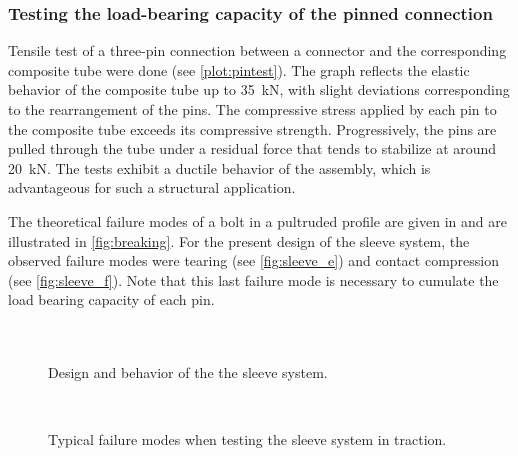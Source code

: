 \subsubsection{Testing the load-bearing capacity of the pinned connection}
Tensile test of a three-pin connection between a connector and the corresponding composite tube were done (see \cref{plot:pintest}). The graph reflects the elastic behavior of the composite tube up to \SI{35}{kN}, with slight deviations corresponding to the rearrangement of the pins. The compressive stress applied by each pin to the composite tube exceeds its compressive strength. Progressively, the pins are pulled through the tube under a residual force that tends to stabilize at around \SI{20}{kN}. The tests exhibit a ductile behavior of the assembly, which is advantageous for such a structural application.

The theoretical failure modes of a bolt in a pultruded profile are given in \cite{Fiberline2003} and are illustrated in \cref{fig:breaking}. For the present design of the sleeve system, the observed failure modes were tearing (see \cref{fig:sleeve_e}) and contact compression (see \cref{fig:sleeve_f}). Note that this last failure mode is necessary to cumulate the load bearing capacity of each pin.

\begin{figure}[p]
	\centering
	\begin{fullpage}
	\hspace*{\fill}
	\\
	\hspace*{\fill}
	\\
	\caption[Design and behavior of the the sleeve system]{Design and behavior of the the sleeve system.}
	\label{fig:sleeve_bench}
	\vspace{0.75cm}
	\hspace*{\fill}
	 \\
	\caption[Typical failure modes when testing the sleeve system in traction]{Typical failure modes when testing the sleeve system in traction.}
	\label{fig:sleeve_failure}
	\end{fullpage}
\end{figure}

